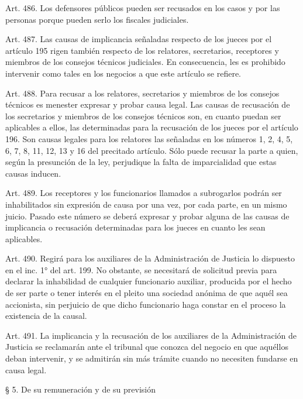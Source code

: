     Art. 486. Los defensores públicos pueden ser recusados en los casos y por las personas porque pueden serlo los fiscales judiciales.



    Art. 487. Las causas de implicancia señaladas respecto de los jueces por el artículo 195 rigen también respecto de los relatores, secretarios, receptores y miembros de los consejos técnicos judiciales.
    En consecuencia, les es prohibido intervenir como tales en los negocios a que este artículo se refiere.



    Art. 488. Para recusar a los relatores, secretarios y miembros de los consejos técnicos es menester expresar y probar causa legal.
    Las causas de recusación de los secretarios y miembros de los consejos técnicos son, en cuanto puedan ser aplicables a ellos, las determinadas para la recusación de los jueces por el artículo 196.
    Son causas legales para los relatores las señaladas en los números 1, 2, 4, 5, 6, 7, 8, 11, 12, 13 y 16 del precitado artículo.
    Sólo puede recusar la parte a quien, según la presunción de la ley, perjudique la falta de imparcialidad que estas causas inducen.



    Art. 489. Los receptores y los funcionarios llamados a subrogarlos podrán ser inhabilitados sin expresión de causa por una vez, por cada parte, en un mismo juicio. Pasado este número se deberá expresar y probar alguna de las causas de implicancia o recusación determinadas para los jueces en cuanto les sean aplicables.




    Art. 490. Regirá para los auxiliares de la Administración de Justicia lo dispuesto en el inc. 1° del art. 199.
    No obstante, se necesitará de solicitud previa para declarar la inhabilidad de cualquier funcionario auxiliar, producida por el hecho de ser parte o tener interés en el pleito una sociedad anónima de que aquél sea accionista, sin perjuicio de que dicho funcionario haga constar en el proceso la existencia de la causal.

    Art. 491. La implicancia y la recusación de los auxiliares de la Administración de Justicia se reclamarán ante el tribunal que conozca del negocio en que aquéllos deban intervenir, y se admitirán sin más trámite cuando no necesiten fundarse en causa legal.



    § 5. De su remuneración y de su previsión


